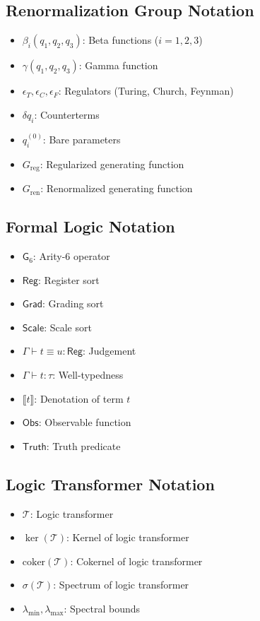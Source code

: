 \subsection{Renormalization Group Notation}
\begin{itemize}
\item $\beta_i(q_1,q_2,q_3)$: Beta functions ($i = 1,2,3$)
\item $\gamma(q_1,q_2,q_3)$: Gamma function
\item $\epsilon_T, \epsilon_C, \epsilon_F$: Regulators (Turing, Church, Feynman)
\item $\delta q_i$: Counterterms
\item $q_i^{(0)}$: Bare parameters
\item $G_{\text{reg}}$: Regularized generating function
\item $G_{\text{ren}}$: Renormalized generating function
\end{itemize}

\subsection{Formal Logic Notation}
\begin{itemize}
\item $\mathsf{G}_6$: Arity-6 operator
\item $\mathsf{Reg}$: Register sort
\item $\mathsf{Grad}$: Grading sort
\item $\mathsf{Scale}$: Scale sort
\item $\Gamma \vdash t \equiv u : \mathsf{Reg}$: Judgement
\item $\Gamma \vdash t : \tau$: Well-typedness
\item $\llbracket t \rrbracket$: Denotation of term $t$
\item $\mathsf{Obs}$: Observable function
\item $\mathsf{Truth}$: Truth predicate
\end{itemize}

\subsection{Logic Transformer Notation}
\begin{itemize}
\item $\mathcal{T}$: Logic transformer
\item $\ker(\mathcal{T})$: Kernel of logic transformer
\item $\text{coker}(\mathcal{T})$: Cokernel of logic transformer
\item $\sigma(\mathcal{T})$: Spectrum of logic transformer
\item $\lambda_{\min}, \lambda_{\max}$: Spectral bounds
\end{itemize}

